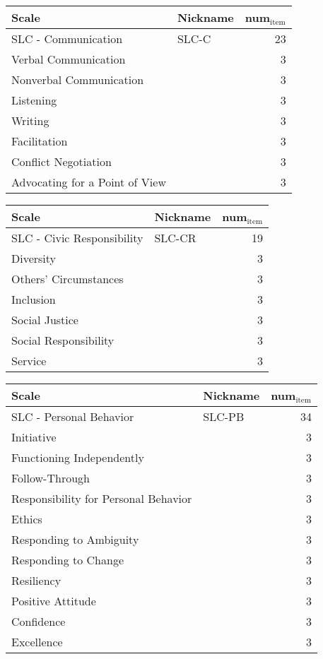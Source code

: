 \documentclass[11pt]{article}
\begin{document}
\begin{center}
\begin{tabular}{llr}
Scale & Nickname & num\(_{\text{item}}\)\\
\hline
SLC - Communication & SLC-C & 23\\
\hline
Verbal Communication &  & 3\\
Nonverbal Communication &  & 3\\
Listening &  & 3\\
Writing &  & 3\\
Facilitation &  & 3\\
Conflict Negotiation &  & 3\\
Advocating for a Point of View &  & 3\\
\end{tabular}
\end{center}




\begin{center}
\begin{tabular}{llr}
Scale & Nickname & num\(_{\text{item}}\)\\
\hline
SLC - Civic Responsibility & SLC-CR & 19\\
\hline
Diversity &  & 3\\
Others’ Circumstances &  & 3\\
Inclusion &  & 3\\
Social Justice &  & 3\\
Social Responsibility &  & 3\\
Service &  & 3\\
\end{tabular}
\end{center}


\begin{center}
\begin{tabular}{llr}
Scale & Nickname & num\(_{\text{item}}\)\\
\hline
SLC - Personal Behavior & SLC-PB & 34\\
\hline
Initiative &  & 3\\
Functioning Independently &  & 3\\
Follow-Through &  & 3\\
Responsibility for Personal Behavior &  & 3\\
Ethics &  & 3\\
Responding to Ambiguity &  & 3\\
Responding to Change &  & 3\\
Resiliency &  & 3\\
Positive Attitude &  & 3\\
Confidence &  & 3\\
Excellence &  & 3\\
\end{tabular}
\end{center}
\end{document}

